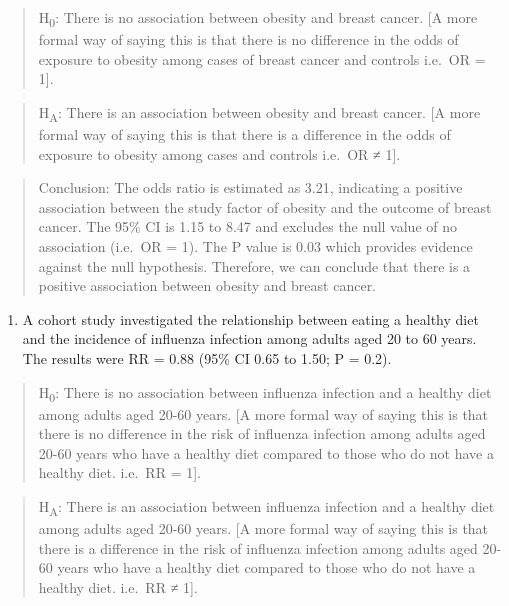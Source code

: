 \documentclass[
]{memoir}
\providecommand{\tightlist}{%
  \setlength{\itemsep}{0pt}\setlength{\parskip}{0pt}}
\begin{document}
\begin{quote}
H\textsubscript{0}: There is no association between obesity and breast cancer.
{[}A more formal way of saying this is that there is no difference in the odds of exposure to obesity among cases of breast cancer and controls i.e.~OR = 1{]}.
\end{quote}

\begin{quote}
H\textsubscript{A}: There is an association between obesity and breast cancer.
{[}A more formal way of saying this is that there is a difference in the odds of exposure to obesity among cases and controls i.e.~OR ≠ 1{]}.
\end{quote}

\begin{quote}
Conclusion: The odds ratio is estimated as 3.21, indicating a positive association between the study factor of obesity and the outcome of breast cancer. The 95\% CI is 1.15 to 8.47 and excludes the null value of no association (i.e.~OR = 1). The P value is 0.03 which provides evidence against the null hypothesis. Therefore, we can conclude that there is a positive association between obesity and breast cancer.
\end{quote}

\begin{enumerate}
\def\labelenumi{\alph{enumi})}
\setcounter{enumi}{2}
\tightlist
\item
  A cohort study investigated the relationship between eating a healthy diet and the incidence of influenza infection among adults aged 20 to 60 years. The results were RR = 0.88 (95\% CI 0.65 to 1.50; P = 0.2).
\end{enumerate}

\begin{quote}
H\textsubscript{0}: There is no association between influenza infection and a healthy diet among adults aged 20-60 years.
{[}A more formal way of saying this is that there is no difference in the risk of influenza infection among adults aged 20-60 years who have a healthy diet compared to those who do not have a healthy diet. i.e.~RR = 1{]}.
\end{quote}

\begin{quote}
H\textsubscript{A}: There is an association between influenza infection and a healthy diet among adults aged 20-60 years.
{[}A more formal way of saying this is that there is a difference in the risk of influenza infection among adults aged 20-60 years who have a healthy diet compared to those who do not have a healthy diet. i.e.~RR ≠ 1{]}.
\end{quote}
\end{document}
